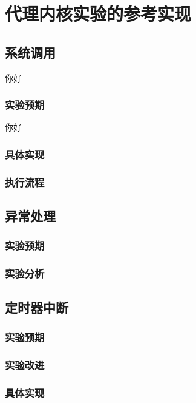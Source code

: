\chapter{代理内核实验的参考实现}

\section{系统调用}
你好
\subsection{实验预期}
你好
\subsection{具体实现}

\subsection{执行流程}

\section{异常处理}

\subsection{实验预期}

\subsection{实验分析}

\section{定时器中断}

\subsection{实验预期}

\subsection{实验改进}

\subsection{具体实现}

